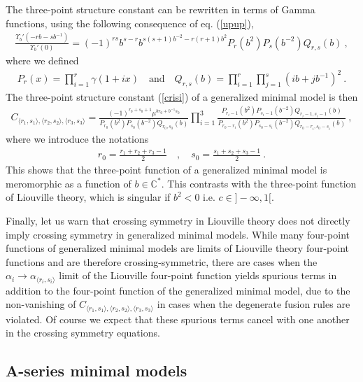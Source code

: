 \documentclass[12pt,a4paper,notitlepage]{report}
\newcommand \C {\mathbb{C}}
\numberwithin{equation}{section}
\theoremstyle{break}
\begin{document}
The three-point structure constant can be rewritten in terms of Gamma functions, using the following consequence of eq. (\ref{upup}),
\begin{align}
 \frac{\Upsilon_b'(-rb-sb^{-1})}{\Upsilon_b'(0)} = (-1)^{rs} b^{s-r} b^{s(s+1)b^{-2}-r(r+1)b^2} P_r(b^2)P_s(b^{-2}) Q_{r,s}(b)\ ,
\end{align}
where we defined
\begin{align}
 P_r(x) = \prod_{i=1}^r \gamma(1+ix) \quad \text{and} \quad Q_{r,s}(b) = \prod_{i=1}^r \prod_{j=1}^s (ib+jb^{-1})^2\ .
\end{align}
The three-point structure constant (\ref{crisi}) of a generalized minimal model is then
\begin{align}
 C_{\langle r_1,s_1\rangle ,\langle r_2,s_2\rangle ,\langle r_3,s_3 \rangle} =  \frac{(-1)^{r_0+s_0+1}\mu^{br_0 + b^{-1}s_0}}{P_{r_0}(b^2)P_{s_0}(b^{-2})Q_{r_0,s_0}(b)} \prod_{i=1}^3 \frac{P_{r_i-1}(b^2)P_{s_i-1}(b^{-2}) Q_{r_i-1,s_i-1}(b)}{P_{r_0-r_i}(b^2)P_{s_0-s_i}(b^{-2}) Q_{r_0-r_i,s_0-s_i}(b)} \ ,
\label{cpqb}
\end{align}
where we introduce the notations 
\begin{align}
 r_0 = \frac{r_1+r_2+r_3-1}{2} \quad , \quad s_0=\frac{s_1+s_2+s_3-1}{2}\ .
\end{align}
This shows that the three-point function of a generalized minimal model is meromorphic as a function of $b\in \C^*$. This contrasts with the three-point function of Liouville theory, which is singular if $b^2 < 0$ i.e. $c\in ]-\infty, 1[$. 

Finally, let us warn that crossing symmetry in Liouville theory does not directly imply crossing symmetry in generalized minimal models. While many four-point functions of generalized minimal models are limits of Liouville theory four-point functions and are therefore crossing-symmetric, there are cases when the $\alpha_i\rightarrow \alpha_{\langle r_i,s_i\rangle}$ limit of the Liouville four-point function yields spurious terms in addition to the four-point function of the generalized minimal model, due to the non-vanishing of $C_{\langle r_1,s_1\rangle ,\langle r_2,s_2\rangle ,\langle r_3,s_3 \rangle}$ in cases when the degenerate fusion rules are violated. Of course we expect that these spurious terms cancel with one another in the crossing symmetry equations.


\subsection{A-series minimal models \label{secamm}}
\end{document}
